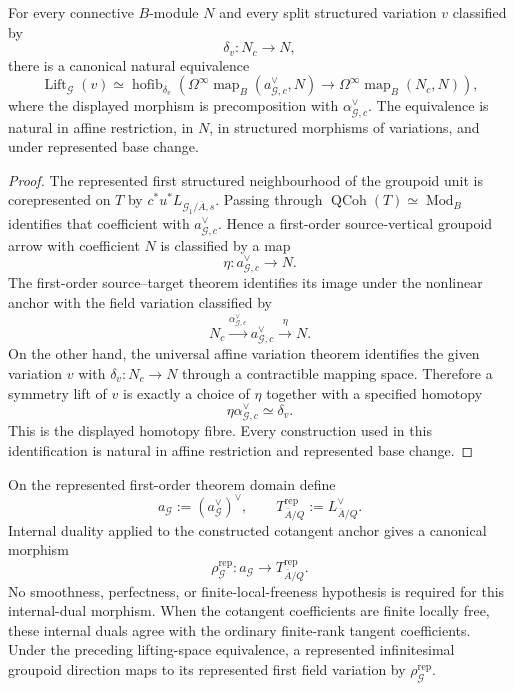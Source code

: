 \begin{theorem}
\label{thm:symmetry-noether-first-order-symmetry-lift-classification}
For every connective $B$-module $N$ and every split structured variation $v$
classified by
\[
\delta_v:N_c\longrightarrow N,
\]
there is a canonical natural equivalence
\[
\boxed{
\operatorname{Lift}_{\mathcal G}(v)
\simeq
\operatorname{hofib}_{\delta_v}
\left(
\Omega^\infty
\operatorname{map}_B(a^\vee_{\mathcal G,c},N)
\longrightarrow
\Omega^\infty
\operatorname{map}_B(N_c,N)
\right),
}
\]
where the displayed morphism is precomposition with
$\alpha^\vee_{\mathcal G,c}$.
The equivalence is natural in affine restriction, in $N$, in structured morphisms
of variations, and under represented base change.
\end{theorem}

\begin{proof}
The represented first structured neighbourhood of the groupoid unit is
corepresented on $T$ by
$c^*u^*L_{\mathcal G_1/\overline A,s}$.  Passing through
$\operatorname{QCoh}(T)\simeq\operatorname{Mod}_B$ identifies that coefficient with
$a^\vee_{\mathcal G,c}$.  Hence a first-order source-vertical groupoid arrow with
coefficient $N$ is classified by a map
\[
\eta:a^\vee_{\mathcal G,c}\longrightarrow N.
\]
The first-order source--target theorem identifies its image under the nonlinear
anchor with the field variation classified by
\[
N_c
\xrightarrow{\alpha^\vee_{\mathcal G,c}}
a^\vee_{\mathcal G,c}
\xrightarrow{\eta}
N.
\]
On the other hand, the universal affine variation theorem identifies the given
variation $v$ with $\delta_v:N_c\to N$ through a contractible mapping space.
Therefore a symmetry lift of $v$ is exactly a choice of $\eta$ together with a
specified homotopy
\[
\eta\alpha^\vee_{\mathcal G,c}\simeq\delta_v.
\]
This is the displayed homotopy fibre.  Every construction used in this
identification is natural in affine restriction and represented base change.
\end{proof}

\begin{corollary}
\label{cor:symmetry-noether-represented-tangent-shadow}
On the represented first-order theorem domain define
\[
a_{\mathcal G}
:=
\left(a_{\mathcal G}^{\vee}\right)^\vee,
\qquad
T_{\overline A/Q}^{\mathrm{rep}}
:=
L_{\overline A/Q}^{\vee}.
\]
Internal duality applied to the constructed cotangent anchor gives a canonical
morphism
\[
\boxed{
\rho_{\mathcal G}^{\mathrm{rep}}:
a_{\mathcal G}\longrightarrow
T_{\overline A/Q}^{\mathrm{rep}}.
}
\]
No smoothness, perfectness, or finite-local-freeness hypothesis is required for
this internal-dual morphism.  When the cotangent coefficients are finite locally
free, these internal duals agree with the ordinary finite-rank tangent coefficients.
Under the preceding lifting-space equivalence, a represented infinitesimal
groupoid direction maps to its represented first field variation by
$\rho_{\mathcal G}^{\mathrm{rep}}$.
\end{corollary}

